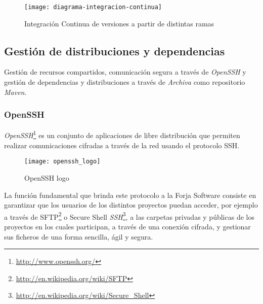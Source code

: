 \begin{figure}[H]
    \centering
    \texttt{[image: diagrama-integracion-continua]}
    \caption{Integración Continua de versiones a partir de distintas ramas}
    \label{fig:diagrama-integracion-continua}
\end{figure}



\subsection{Gestión de distribuciones y dependencias}
\label{sub:distribuciones-dependencias}

\par Gestión de recursos compartidos, comunicación segura a través de \emph{OpenSSH} y gestión de dependencias y distribuciones a través de \emph{Archiva} como repositorio \emph{Maven}.

\subsubsection{OpenSSH}
\label{ssub:openssh}

\par \emph{OpenSSH}\footnote{\url{http://www.openssh.org/}} es un conjunto de aplicaciones de libre distribución que permiten realizar comunicaciones cifradas a través de la red usando el protocolo SSH.

\begin{figure}[H]
    \centering
    \texttt{[image: openssh\_logo]}
    \caption{OpenSSH logo}
    \label{fig:openssh_logo}
\end{figure}

\par La función fundamental que brinda este protocolo a la Forja Software consiste en garantizar que los usuarios de los distintos proyectos puedan acceder, por ejemplo a través de SFTP\footnote{\url{http://en.wikipedia.org/wiki/SFTP}} o Secure Shell \emph{SSH}\footnote{\url{http://en.wikipedia.org/wiki/Secure\_Shell}}, a las carpetas privadas y públicas de los proyectos en los cuales participan, a través de una conexión cifrada, y gestionar sus ficheros de una forma sencilla, ágil y segura.

